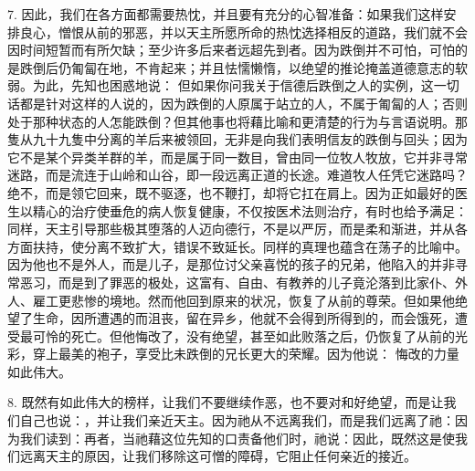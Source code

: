 7. 因此，我们在各方面都需要热忱，并且要有充分的心智准备：如果我们这样安排良心，憎恨从前的邪恶，并以天主所愿所命的热忱选择相反的道路，我们就不会因时间短暂而有所欠缺；至少许多后来者远超先到者。因为跌倒并不可怕，可怕的是跌倒后仍匍匐在地，不肯起来；并且怯懦懒惰，以绝望的推论掩盖道德意志的软弱。为此，先知也困惑地说： 但如果你问我关于信德后跌倒之人的实例，这一切话都是针对这样的人说的，因为跌倒的人原属于站立的人，不属于匍匐的人；否则处于那种状态的人怎能跌倒？但其他事也将藉比喻和更清楚的行为与言语说明。那隻从九十九隻中分离的羊后来被领回，无非是向我们表明信友的跌倒与回头；因为它不是某个异类羊群的羊，而是属于同一数目，曾由同一位牧人牧放，它并非寻常迷路，而是流连于山岭和山谷，即一段远离正道的长途。难道牧人任凭它迷路吗？绝不，而是领它回来，既不驱逐，也不鞭打，却将它扛在肩上。因为正如最好的医生以精心的治疗使垂危的病人恢复健康，不仅按医术法则治疗，有时也给予满足：同样，天主引导那些极其堕落的人迈向德行，不是以严厉，而是柔和渐进，并从各方面扶持，使分离不致扩大，错误不致延长。同样的真理也蕴含在荡子的比喻中。因为他也不是外人，而是儿子，是那位讨父亲喜悦的孩子的兄弟，他陷入的并非寻常恶习，而是到了罪恶的极处，这富有、自由、有教养的儿子竟沦落到比家仆、外人、雇工更悲惨的境地。然而他回到原来的状况，恢复了从前的尊荣。但如果他绝望了生命，因所遭遇的而沮丧，留在异乡，他就不会得到所得到的，而会饿死，遭受最可怜的死亡。但他悔改了，没有绝望，甚至如此败落之后，仍恢复了从前的光彩，穿上最美的袍子，享受比未跌倒的兄长更大的荣耀。因为他说： 悔改的力量如此伟大。\par

8. 既然有如此伟大的榜样，让我们不要继续作恶，也不要对和好绝望，而是让我们自己也说：，并让我们亲近天主。因为祂从不远离我们，而是我们远离了祂：因为我们读到：再者，当祂藉这位先知的口责备他们时，祂说：因此，既然这是使我们远离天主的原因，让我们移除这可憎的障碍，它阻止任何亲近的接近。\par


